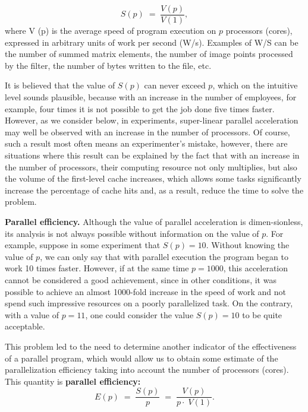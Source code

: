 {	\begin{equation}
		\label{parallelAcceleration:equation}
		S(p)\;=\;\frac{V(p)}{V(1)},
	\end{equation}
	where V (p) is the average speed of program execution on $p$ processors (cores), expressed in arbitrary units of work per second (W/s). Examples of W/S can be the number of summed matrix elements, the number of image points processed by the filter, the number of bytes written to the file, etc.
	\par It is believed that the value of $ S(p)$ can never exceed $p$, which on the intuitive level sounds plausible, because with an increase in the number of employees, for example, four times it is not possible to get the job done five times faster. However, as we consider below, in experiments, super-linear parallel acceleration may well be observed with an increase in the number of processors. Of course, such a result most often means an experimenter's mistake, however, there are situations where this result can be explained by the fact that with an increase in the number of processors, their computing resource not only multiplies, but also the volume of the first-level cache increases, which allows some tasks significantly increase the percentage of cache hits and, as a result, reduce the time to solve the problem.
	\par\textbf{Parallel efficiency.} Although the value of parallel acceleration is dimen-sionless, its analysis is not always possible without information on the value of $p$. For example, suppose in some experiment that $S(p) = 10 $. Without knowing the value of $p$, we can only say that with parallel execution the program began to work 10 times faster. However, if at the same time $ p = 1000 $, this acceleration cannot be considered a good achievement, since in other conditions, it was possible to achieve an almost 1000-fold increase in the speed of work and not spend such impressive resources on a poorly parallelized task. On the contrary, with a value of $ p = 11 $, one could consider the value $ S (p) = 10 $ to be quite acceptable.
	\par This problem led to the need to determine another indicator of the effectiveness of a parallel program, which would allow us to obtain some estimate of the parallelization efficiency taking into account the number of processors (cores). This quantity is
	 \textbf{parallel efficiency:}
	\begin{equation}
		\label{parallelEffect:equation}
		E(p)\;=\;\frac{S(p)}p\;=\;\frac{V(p)}{p\cdot\;V(1)}.

\end{equation}}
